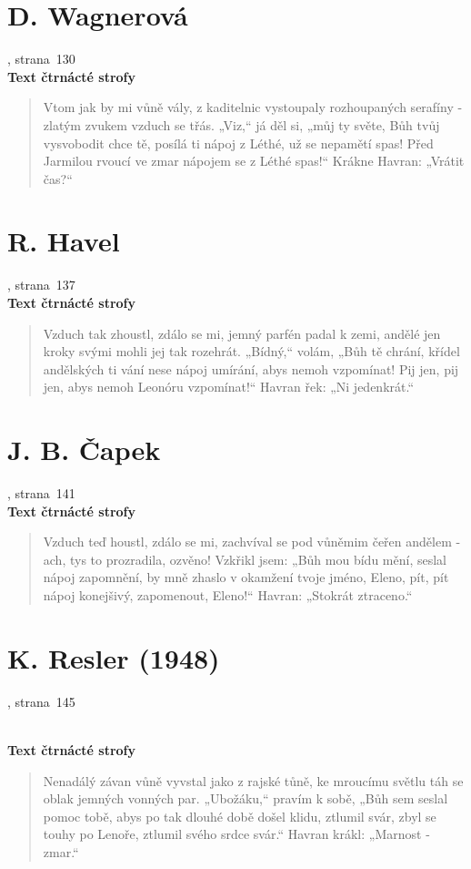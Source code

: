 \documentclass[dp.tex]{subfiles}
\begin{document}
\section*{D. Wagnerová}
, strana~130
\\\textbf{Text čtrnácté strofy}
\begin{verse}
Vtom jak by mi vůně vály,
z kaditelnic vystoupaly
rozhoupaných serafíny -
zlatým zvukem vzduch se třás.
„Viz,“ já děl si, „můj ty světe,
Bůh tvůj vysvobodit chce tě,
posílá ti nápoj z Léthé,
už se nepamětí spas!
Před Jarmilou rvoucí ve zmar
nápojem se z Léthé spas!“
Krákne Havran: „Vrátit čas?“
\end{verse}

\section*{R. Havel}
, strana~137
\\\textbf{Text čtrnácté strofy}
\begin{verse}
Vzduch tak zhoustl, zdálo se mi, jemný parfén padal k zemi,
andělé jen kroky svými mohli jej tak rozehrát.
„Bídný,“ volám, „Bůh tě chrání, křídel andělských ti vání
nese nápoj umírání, abys nemoh vzpomínat!
Pij jen, pij jen, abys nemoh Leonóru vzpomínat!“
Havran řek: „Ni jedenkrát.“
\end{verse}

\section*{J. B. Čapek}
, strana~141
\\\textbf{Text čtrnácté strofy}
\begin{verse}
Vzduch teď houstl, zdálo se mi, zachvíval se pod vůněmim
čeřen andělem - ach, tys to prozradila, ozvěno!
Vzkřikl jsem: „Bůh mou bídu mění, seslal nápoj zapomnění,
by mně zhaslo v okamžení tvoje jméno, Eleno,
pít, pít nápoj konejšivý, zapomenout, Eleno!“
Havran: „Stokrát ztraceno.“
\end{verse}

\section*{K. Resler (1948)}
, strana~145
\begin{samepage}
\\\textbf{Text čtrnácté strofy}
\begin{verse}
Nenadálý závan vůně vyvstal jako z rajské tůně,
ke mroucímu světlu táh se oblak jemných vonných par.
„Ubožáku,“ pravím k sobě, „Bůh sem seslal pomoc tobě,
abys po tak dlouhé době došel klidu, ztlumil svár,
zbyl se touhy po Lenoře, ztlumil svého srdce svár.“
Havran krákl: „Marnost - zmar.“
\end{verse}
\end{samepage}
\end{document}
